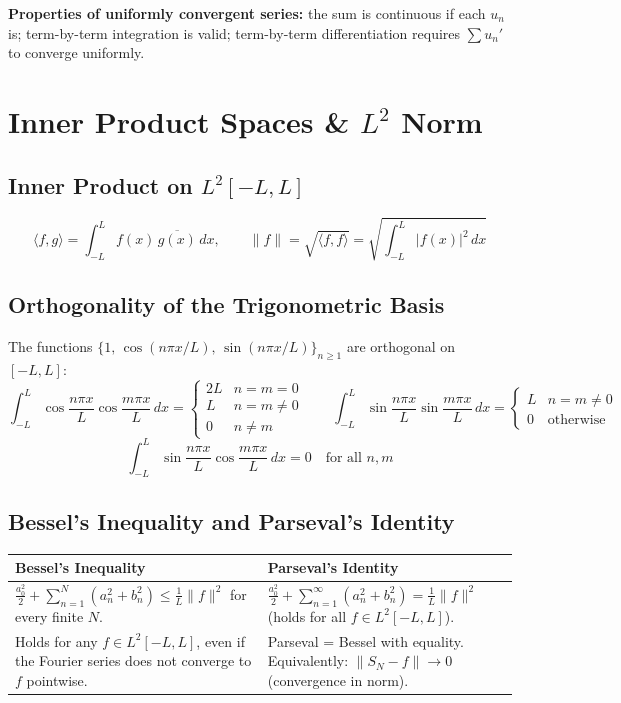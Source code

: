 \documentclass[12pt, a4paper]{article}
\theoremstyle{definition}
\theoremstyle{remark}
\begin{document}
\textbf{Properties of uniformly convergent series:} the sum is continuous if each $u_n$ is; term-by-term
integration is valid; term-by-term differentiation requires $\sum u_n'$ to converge uniformly.

\section{Inner Product Spaces \& $L^2$ Norm}

\subsection{Inner Product on $L^2[-L,L]$}

\[
  \langle f, g \rangle = \int_{-L}^{L} f(x)\,\overline{g(x)}\,dx,
  \qquad
  \|f\| = \sqrt{\langle f,f\rangle} = \sqrt{\int_{-L}^L |f(x)|^2\,dx}
\]

\subsection{Orthogonality of the Trigonometric Basis}

The functions $\{1,\,\cos(n\pi x/L),\,\sin(n\pi x/L)\}_{n\ge 1}$ are orthogonal on $[-L,L]$:
\[
  \int_{-L}^{L} \cos\frac{n\pi x}{L}\cos\frac{m\pi x}{L}\,dx
  = \begin{cases} 2L & n=m=0 \\ L & n=m\neq 0 \\ 0 & n\neq m \end{cases}
  \qquad
  \int_{-L}^{L} \sin\frac{n\pi x}{L}\sin\frac{m\pi x}{L}\,dx
  = \begin{cases} L & n=m\neq 0 \\ 0 & \text{otherwise} \end{cases}
\]
\[
  \int_{-L}^{L} \sin\frac{n\pi x}{L}\cos\frac{m\pi x}{L}\,dx = 0 \quad \text{for all } n,m
\]

\subsection{Bessel's Inequality and Parseval's Identity}

\begin{center}
\renewcommand{\arraystretch}{1.5}
\begin{tabular}{p{6.5cm}p{6.5cm}}
\toprule
\textbf{Bessel's Inequality} & \textbf{Parseval's Identity} \\
\midrule
$\displaystyle\frac{a_0^2}{2} + \sum_{n=1}^{N}(a_n^2+b_n^2) \le \frac{1}{L}\|f\|^2$
\newline for every finite $N$.
&
$\displaystyle\frac{a_0^2}{2} + \sum_{n=1}^{\infty}(a_n^2+b_n^2) = \frac{1}{L}\|f\|^2$
\newline (holds for all $f \in L^2[-L,L]$). \\[6pt]
Holds for any $f \in L^2[-L,L]$, even if the Fourier series does not converge to $f$ pointwise.
& Parseval = Bessel with equality.
Equivalently: $\|S_N - f\| \to 0$ (convergence in norm). \\
\bottomrule
\end{tabular}
\end{center}
\end{document}
